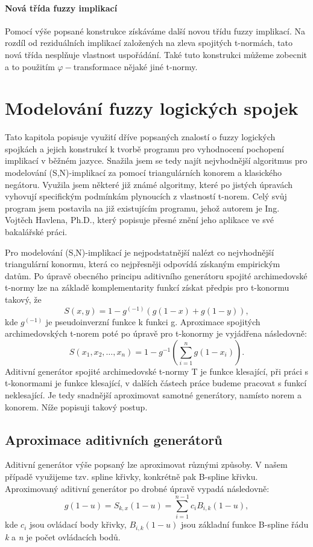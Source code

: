 \subsubsection{Nová třída fuzzy implikací}
Pomocí výše popsané konstrukce získáváme další novou třídu fuzzy implikací. Na rozdíl od reziduálních implikací založených na zleva spojitých t-normách, tato nová třída nespl\v nuje vlastnost uspořádání. Také tuto konstrukci můžeme zobecnit a to použitím $\varphi-$transformace nějaké jiné t-normy.


\chapter{Modelování fuzzy logických spojek}
Tato kapitola popisuje využití dříve popsaných znalostí o fuzzy logických spojkách a jejich konstrukcí k tvorbě programu pro vyhodnocení pochopení implikací v běžném jazyce. Snažila jsem se tedy najít nejvhodnější algoritmus pro modelování (S,N)-implikací za pomocí triangulárních konorem a klasického negátoru. Využila jsem některé již známé algoritmy, které po jistých \' upravách vyhovují specifickým podmínkám plynoucích z vlastností t-norem. Celý sv\r uj program jsem postavila na již existujícím programu, jehož autorem je Ing. Vojtěch Havlena, Ph.D., který popisuje přesné znění jeho aplikace ve své bakalářské práci. \cite{havlena}

Pro modelování (S,N)-implikací je nejpodstatnější nalézt co nejvhodnější triangulární konormu, která co nejpřesněji odpovídá získaným empirickým dat\r um. Po \' upravě obecného principu aditivního generátoru spojité archimedovské t-normy \cite{alsina} lze na základě komplementarity funkcí získat předpis pro t-konormu takový, že $$S(x,y) = 1 - g^{(-1)}(g(1-x) + g(1-y)),$$ kde $g^{(-1)}$ je pseudoinverzní funkce k funkci g. Aproximace spojitých archimedovských t-norem poté po \' upravě pro t-konormy je vyjádřena následovně: $$S(x_1, x_2, \dots, x_n) = 1 - g^{-1}\left(\sum_{i = 1}^{n} g(1 - x_i)\right).$$
Aditivní generátor spojité archimedovské t-normy T je funkce klesající, při práci s t-konormami je funkce klesající, v dalších částech práce budeme pracovat s funkcí neklesající. Je tedy snadnější aproximovat samotné generátory, namísto norem a konorem. Níže popisuji takový postup.

\section{Aproximace aditivních generátor\r u}
Aditivní generátor výše popsaný lze aproximovat r\r uznými zp\r usoby. V našem případě využijeme tzv. spline křivky, konkrétně pak B-spline křivku. Aproximovaný aditivní generátor po drobné \' upravě vypadá následovně: $$g(1-u) = S_{k,x}(1-u) = \sum_{i = 1}^{n-1}c_iB_{i,k}(1-u),$$ kde \textit{$c_i$} jsou ovládací body křivky, \textit{$B_{i,k}(1-u)$} jsou základní funkce B-spline řádu \textit{k} a \textit{n} je počet ovládacích bod\r u.

